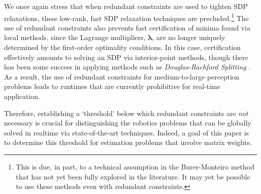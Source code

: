 \documentclass[lettersize,journal]{IEEEtran}
\begin{document}
We once again stress that when redundant constraints are used to tighten SDP relaxations, these low-rank, fast SDP relaxation techniques are precluded.\footnote{This is due, in part, to a technical assumption in the Burer-Monteiro method that has not yet been fully explored in the literature. It may yet be possible to use these methods even with redundant constraints.} The use of redundant constraints also prevents fast certification of minima found via local methods, since the Lagrange multipliers, $ \bm{\lambda} $, are no longer uniquely determined by the first-order optimality conditions. In this case, certification effectively amounts to solving an SDP via interior-point methods, though there has been some success in applying methods such as \textit{Douglas-Rachford Splitting} \cite{yangTEASERFastCertifiable2021}. As a result, the use of redundant constraints for medium-to-large perception problems leads to runtimes that are currently prohibitive for real-time application.

Therefore, establishing a `threshold' below which redundant constraints are \emph{not} necessary is crucial for distinguishing the robotics problems that can be globally solved in realtime via state-of-the-art techniques. Indeed, a goal of this paper is to determine this threshold for estimation problems that involve matrix weights.
\end{document}
